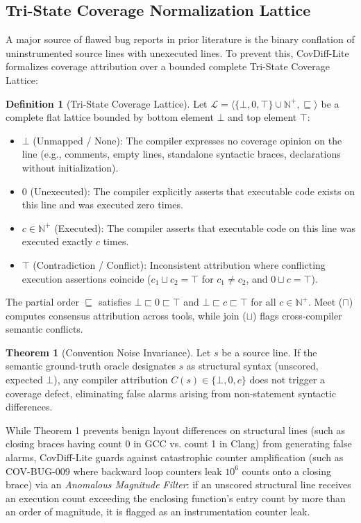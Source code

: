 \documentclass[sigconf,review,anonymous=false]{acmart}
\theoremstyle{definition}
\newtheorem{definition}{Definition}
\newtheorem{theorem}{Theorem}
\begin{document}
\subsection{Tri-State Coverage Normalization Lattice}
A major source of flawed bug reports in prior literature is the binary conflation of uninstrumented source lines with unexecuted lines. To prevent this, CovDiff-Lite formalizes coverage attribution over a bounded complete Tri-State Coverage Lattice:

\begin{definition}[Tri-State Coverage Lattice]
Let $\mathcal{L} = \langle \{\bot, 0, \top\} \cup \mathbb{N}^+, \sqsubseteq \rangle$ be a complete flat lattice bounded by bottom element $\bot$ and top element $\top$:
\begin{itemize}
    \item $\bot$ (Unmapped / None): The compiler expresses no coverage opinion on the line (e.g., comments, empty lines, standalone syntactic braces, declarations without initialization).
    \item $0$ (Unexecuted): The compiler explicitly asserts that executable code exists on this line and was executed zero times.
    \item $c \in \mathbb{N}^+$ (Executed): The compiler asserts that executable code on this line was executed exactly $c$ times.
    \item $\top$ (Contradiction / Conflict): Inconsistent attribution where conflicting execution assertions coincide ($c_1 \sqcup c_2 = \top$ for $c_1 \neq c_2$, and $0 \sqcup c = \top$).
\end{itemize}
The partial order $\sqsubseteq$ satisfies $\bot \sqsubset 0 \sqsubset \top$ and $\bot \sqsubset c \sqsubset \top$ for all $c \in \mathbb{N}^+$. Meet ($\sqcap$) computes consensus attribution across tools, while join ($\sqcup$) flags cross-compiler semantic conflicts.
\end{definition}

\begin{theorem}[Convention Noise Invariance]
Let $s$ be a source line. If the semantic ground-truth oracle designates $s$ as structural syntax (unscored, expected $\bot$), any compiler attribution $C(s) \in \{\bot, 0, c\}$ does not trigger a coverage defect, eliminating false alarms arising from non-statement syntactic differences.
\end{theorem}

While Theorem 1 prevents benign layout differences on structural lines (such as closing braces having count 0 in GCC vs. count 1 in Clang) from generating false alarms, CovDiff-Lite guards against catastrophic counter amplification (such as COV-BUG-009 where backward loop counters leak $10^6$ counts onto a closing brace) via an \textit{Anomalous Magnitude Filter}: if an unscored structural line receives an execution count exceeding the enclosing function's entry count by more than an order of magnitude, it is flagged as an instrumentation counter leak.
\end{document}
